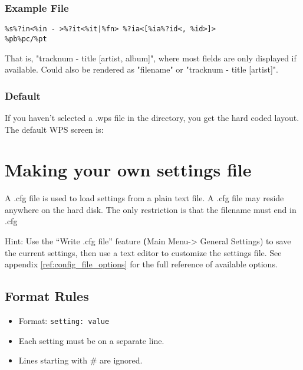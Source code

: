 \subsubsection{Example File}
\begin{verbatim}
%s%?in<%in - >%?it<%it|%fn> %?ia<[%ia%?id<, %id>]>
%pb%pc/%pt
\end{verbatim}
That is, "tracknum - title [artist, album]", where most fields are only displayed if available. Could also be rendered as "filename" or "tracknum - title [artist]".

\subsubsection{Default}
If you haven't selected a .wps file in the  directory, you get the hard coded layout. The default WPS screen is:


\section{\label{ref:SettingsFile}Making your own settings file}
A .cfg file is used to load settings from a plain text file. A .cfg file may reside anywhere on the hard disk. The only restriction is that the filename must end in .cfg

Hint: Use the ``Write .cfg file'' feature \textbf({Main Menu{}-{\textgreater} General Settings}) to save the current settings, then use a text editor to customize the settings file. See appendix \ref{ref:config_file_options} for the full reference of available options.

\subsection{Format Rules}

\begin{itemize}
\item Format: \verb+setting: value+
\item Each setting must be on a separate line.
\item Lines starting with \# are ignored.
\end{itemize}

